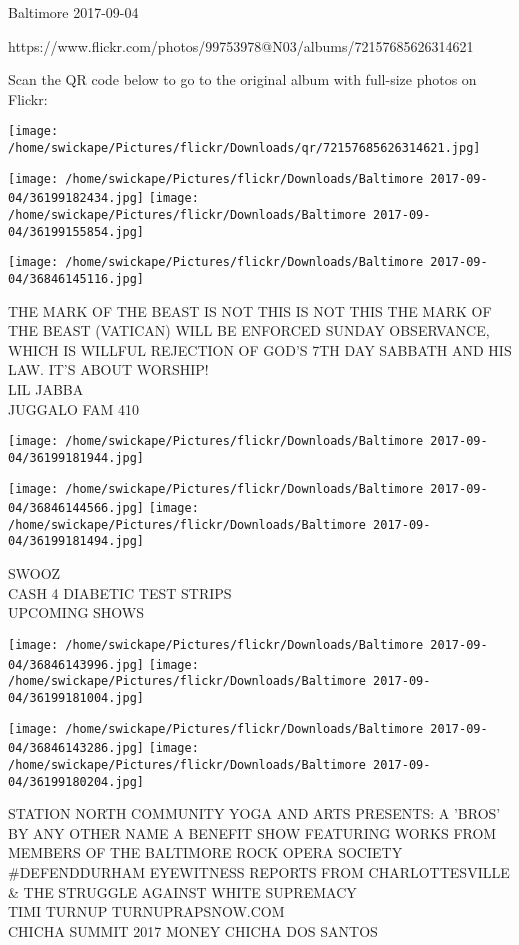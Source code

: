\documentclass[10pt,letterpaper]{article}
\begin{document}
Baltimore 2017-09-04

https://www.flickr.com/photos/99753978@N03/albums/72157685626314621

Scan the QR code below to go to the original album with full-size photos on Flickr:

\texttt{[image: /home/swickape/Pictures/flickr/Downloads/qr/72157685626314621.jpg]}
\pagebreak

\texttt{[image: /home/swickape/Pictures/flickr/Downloads/Baltimore 2017-09-04/36199182434.jpg]}
\texttt{[image: /home/swickape/Pictures/flickr/Downloads/Baltimore 2017-09-04/36199155854.jpg]}

\vspace{0.25in}
\texttt{[image: /home/swickape/Pictures/flickr/Downloads/Baltimore 2017-09-04/36846145116.jpg]}

THE MARK OF THE BEAST IS NOT THIS IS NOT THIS THE MARK OF THE BEAST (VATICAN) WILL BE ENFORCED SUNDAY OBSERVANCE, WHICH IS WILLFUL REJECTION OF GOD'S 7TH DAY SABBATH AND HIS LAW.  IT'S ABOUT WORSHIP!\\
LIL JABBA\\
JUGGALO FAM 410\\
\pagebreak

\texttt{[image: /home/swickape/Pictures/flickr/Downloads/Baltimore 2017-09-04/36199181944.jpg]}

\vspace{0.25in}
\texttt{[image: /home/swickape/Pictures/flickr/Downloads/Baltimore 2017-09-04/36846144566.jpg]}
\texttt{[image: /home/swickape/Pictures/flickr/Downloads/Baltimore 2017-09-04/36199181494.jpg]}

SWOOZ\\
CASH 4 DIABETIC TEST STRIPS\\
UPCOMING SHOWS\\
\pagebreak

\texttt{[image: /home/swickape/Pictures/flickr/Downloads/Baltimore 2017-09-04/36846143996.jpg]}
\texttt{[image: /home/swickape/Pictures/flickr/Downloads/Baltimore 2017-09-04/36199181004.jpg]}

\texttt{[image: /home/swickape/Pictures/flickr/Downloads/Baltimore 2017-09-04/36846143286.jpg]}
\texttt{[image: /home/swickape/Pictures/flickr/Downloads/Baltimore 2017-09-04/36199180204.jpg]}

STATION NORTH COMMUNITY YOGA AND ARTS PRESENTS: A 'BROS' BY ANY OTHER NAME A BENEFIT SHOW FEATURING WORKS FROM MEMBERS OF THE BALTIMORE ROCK OPERA SOCIETY\\
\#DEFENDDURHAM EYEWITNESS REPORTS FROM CHARLOTTESVILLE \& THE STRUGGLE AGAINST WHITE SUPREMACY\\
TIMI TURNUP TURNUPRAPSNOW.COM\\
CHICHA SUMMIT 2017 MONEY CHICHA DOS SANTOS\\
\pagebreak
\end{document}
